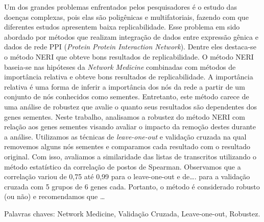 \begin{resumo}

Um dos grandes problemas enfrentados pelos pesquisadores é o estudo das doenças complexas, pois elas são poligênicas e multifatoriais, fazendo com que diferentes estudos apresentem baixa replicabilidade. Esse problema em sido abordado por métodos que realizam integração de dados entre expressão gênica e dados de rede PPI (\textit{Protein Protein Interaction Network}). Dentre eles destaca-se o método NERI que obteve bons resultados de replicabilidade. O método NERI baseia-se nas hipóteses da \textit{Network Medicine} combinadas com métodos de importância relativa e obteve bons resultados de replicabilidade. A importância relativa é uma forma de inferir a importância dos nós da rede a partir de um conjunto de nós conhecidos como sementes. Entretanto, este método carece de uma análise de robustez que avalie o quanto seus resultados são dependentes dos genes sementes. Neste trabalho, analisamos a robustez do método NERI com relação aos genes sementes visando avaliar o impacto da remoção destes durante a análise. Utilizamos as técnicas de \textit{leave-one-out} e validação cruzada na qual removemos alguns nós sementes e comparamos cada resultado com o resultado original. Com isso, avaliamos a similaridade das listas de transcritos utilizando o método estatístico da correlação de postos de Spearman. Observamos que a correlação variou de 0,75 até 0,99 para o leave-one-out e de…. para a validação cruzada com 5 grupos de 6 genes cada. Portanto, o método é considerado robusto (ou não) e recomendamos que …

Palavras chaves: Network Medicine, Validação Cruzada, Leave-one-out, Robustez.
\end{resumo}